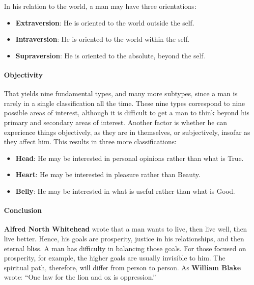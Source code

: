 In his relation to the world, a man may have three orientations:

\begin{itemize}
\item \textbf{Extraversion}: He is oriented to the world outside the self.

\item \textbf{Intraversion}: He is oriented to the world within the self.

\item \textbf{Supraversion}: He is oriented to the absolute, beyond the self.
\end{itemize}


\paragraph{Objectivity}


That yields nine fundamental types, and many more subtypes, since a man is rarely in a single classification all the time. These nine types correspond to nine possible areas of interest, although it is difficult to get a man to think beyond his primary and secondary areas of interest. Another factor is whether he can experience things objectively, as they are in themselves, or subjectively, insofar as they affect him. This results in three more classifications:

\begin{itemize}


\item \textbf{Head}: He may be interested in personal opinions rather than what is True.

\item \textbf{Heart}: He may be interested in pleasure rather than Beauty.

\item \textbf{Belly}: He may be interested in what is useful rather than what is Good.
\end{itemize}


\paragraph{Conclusion}


\textbf{Alfred North Whitehead} wrote that a man wants to live, then live well, then live better. Hence, his goals are prosperity, justice in his relationships, and then eternal bliss. A man has difficulty in balancing those goals. For those focused on prosperity, for example, the higher goals are usually invisible to him. The spiritual path, therefore, will differ from person to person. As \textbf{William Blake} wrote: ``One law for the lion and ox is oppression.''

